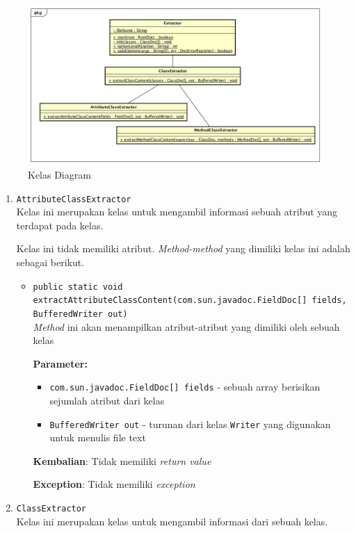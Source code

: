 \documentclass[a4paper,twoside]{article}
\begin{document}
\begin{enumerate}
\begin{figure}[H]
	\centering  
	\includegraphics[scale=0.4]{Gambar/kelas-diagram}  
	\caption[Kelas Diagram]{Kelas Diagram} 
	\label{fig:kelas-diagram} 
\end{figure} 

\begin{enumerate}
\item \texttt{AttributeClassExtractor}\\ 
Kelas ini merupakan kelas untuk mengambil informasi sebuah atribut yang
 terdapat pada kelas.

Kelas ini tidak memiliki atribut. \textit{Method-method} yang dimiliki kelas ini adalah sebagai berikut.
\begin{itemize}
\item \texttt{public static void extractAttributeClassContent(com.sun.javadoc.FieldDoc[] fields, BufferedWriter out)}\\ 
\textit{Method} ini akan menampilkan atribut-atribut yang dimiliki oleh
 sebuah kelas

\textbf{Parameter:}
\begin{itemize}
\item \texttt{com.sun.javadoc.FieldDoc[] fields} - 
sebuah array berisikan sejumlah atribut dari kelas
\item \texttt{BufferedWriter out} - 
turunan dari kelas \texttt{Writer} yang digunakan untuk menulis
 file text
\end{itemize}
\textbf{Kembalian}: Tidak memiliki \textit{return value}

\textbf{Exception}: Tidak memiliki \textit{exception}

\end{itemize}
\item \texttt{ClassExtractor}\\ 
Kelas ini merupakan kelas untuk mengambil informasi dari sebuah kelas.


\end{enumerate}
\end{enumerate}
\end{document}
